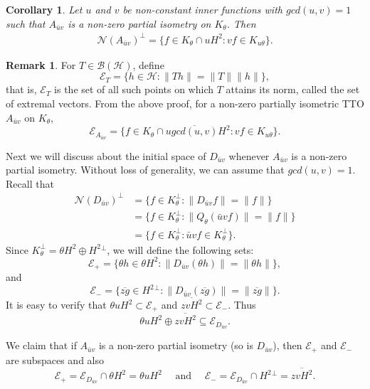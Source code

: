 \documentclass[12pt]{amsart}
\newcommand{\clb}{\mathcal{B}}
\newcommand{\cle}{\mathcal{E}}
\newcommand{\clh}{\mathcal{H}}
\newcommand{\cln}{\mathcal{N}}
\newcommand{\h}{{H}^2}
\theoremstyle{definition}
\theoremstyle{plain}
\newtheorem{cor}[thm]{Corollary}
\theoremstyle{definition}
\newtheorem{rem}[thm]{Remark}
\numberwithin{equation}{section}
\begin{document}
	
	
\begin{cor}
Let $u$ and $v$ be non-constant inner functions with $gcd(u,v)=1$ such that $A_{\bar{u}v}$ is a non-zero partial isometry on $K_\theta$. Then
\begin{align}\label{gcd1}
\cln(A_{\bar{u}v})^\perp=\{f \in K_\theta \cap u \h: vf \in K_{u\theta}\}.
\end{align}
\end{cor}
	
	
	
\begin{rem}
For $T\in \clb(\clh)$, define 
\[
\cle_{T}=\{h \in \clh: \|Th\|=\|T\|\|h\|\},
\]
that is, $\cle_{T}$ is the set of all such points on which $T$ attains its norm, called the set of extremal vectors. From the above proof, for a non-zero partially isometric 
TTO $A_{\bar{u}v}$ on $K_\theta$, 
\[
\cle_{A_{\bar{u}v}}=\{f \in K_\theta \cap u \overline{gcd(u,v)}\h: vf \in K_{u\theta}\}.
\]
\end{rem}
	
	
Next we will discuss about the initial space of $D_{\bar{u}v}$ whenever $A_{\bar{u}v}$ is a non-zero partial isometry. Without loss of generality, we can assume that $gcd(u,v)=1$.
Recall that
\begin{align*}
		\cln(D_{\bar{u}v})^\perp&=\{f \in K_\theta^\perp: \|D_{\bar{u}v}f\|=\|f\|\}\\
		&=\{f \in K_\theta^\perp: \|Q_{\theta}(\bar{u}v f)\|= \|f \| \}\\
		&=\{f \in K_\theta^\perp: \bar{u}v f \in K_{\theta}^\perp\}.
\end{align*}
Since $K_{\theta}^{\perp}= \theta \h \oplus \h{}^{\perp}$, we will define the following sets:
\[
\cle_{+}=\{ \theta h \in \theta \h : \|D_{\bar{u}v}(\theta h)\|=\|\theta h\|\},
\]
and
\[
\cle_{-}=\{\overline{zg} \in \h{}^\perp : \|D_{\bar{u}v}(\overline{zg})\|=\|\overline{zg}\|\}.
\]
It is easy to verify that $\theta u\h \subset \cle_+$ and $\overline{zv\h} \subset \cle_-$. Thus
	\[
	\theta u\h \oplus \overline{zv\h} \subseteq \cle_{D_{\bar{u}v}}.
	\] 

We claim that if $A_{\bar{u}v}$ is a non-zero partial isometry (so is $D_{\bar{u}v}$), then $\cle_{+}$ and $\cle_{-}$ are subspaces and also
\[
\cle_{+}=\cle_{D_{\bar{u}v}} \cap \theta \h =\theta u\h \quad \text{ and } \quad 
\cle_{-}=\cle_{D_{\bar{u}v}} \cap \h{}^\perp=\overline{zv\h}.
\]
	
\end{document}
